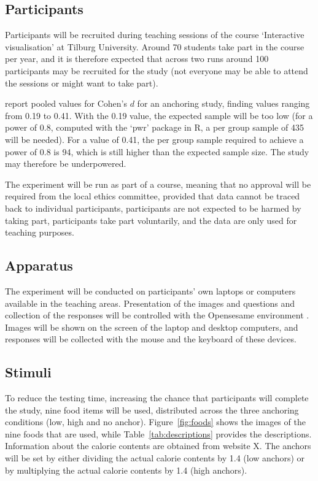 \documentclass[a4paper,doc,natbib]{apa6}
\begin{document}
\subsection{Participants}

Participants will be recruited during teaching sessions of the course `Interactive visualisation' at Tilburg University. Around 70 students take part in the course per year, and it is therefore expected that across two runs around 100 participants may be recruited for the study (not everyone may be able to attend the sessions or might want to take part).

\citet{shanks2020incidental} report pooled values for Cohen's $d$ for an anchoring study, finding values ranging from 0.19 to 0.41. With the 0.19 value, the expected sample will be too low (for a power of 0.8, computed with the `pwr' package in R, a per group sample of 435 will be needed). For a value of 0.41, the per group sample required to achieve a power of 0.8 is 94, which is still higher than the expected sample size. The study may therefore be underpowered.

The experiment will be run as part of a course, meaning that no approval will be required from the local ethics committee, provided that data cannot be traced back to individual participants, participants are not expected to be harmed by taking part, participants take part voluntarily, and the data are only used for teaching purposes.

\subsection{Apparatus}

The experiment will be conducted on participants' own laptops or computers available in the teaching areas. Presentation of the images and questions and collection of the responses will be controlled with the Opensesame environment \citep{mathot2012opensesame}. Images will be shown on the screen of the laptop and desktop computers, and responses will be collected with the mouse and the keyboard of these devices.

\subsection{Stimuli}

To reduce the testing time, increasing the chance that participants will complete the study, nine food items will be used, distributed across the three anchoring conditions (low, high and no anchor). Figure~\ref{fig:foods} shows the images of the nine foods that are used, while Table~\ref{tab:descriptions} provides the descriptions. Information about the calorie contents are obtained from website X. The anchors will be set by either dividing the actual calorie contents by 1.4 (low anchors) or by multiplying the actual calorie contents by 1.4 (high anchors).
\end{document}
